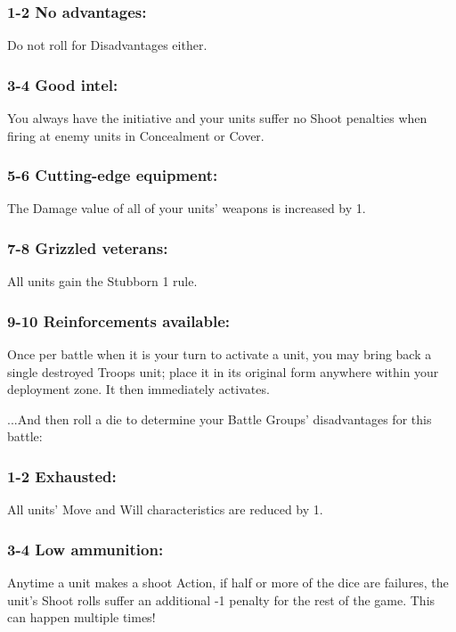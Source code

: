 \begin{multicols}{2}
\subsubsection*{1-2 No advantages:} Do not roll for Disadvantages either.

\subsubsection*{3-4 Good intel:} You always have the initiative and your units suffer no Shoot penalties when firing at enemy units in Concealment or Cover.

\subsubsection*{5-6 Cutting-edge equipment:} The Damage value of all of your units' weapons is increased by 1.

\subsubsection*{7-8 Grizzled veterans:} All units gain the Stubborn 1 rule.

\subsubsection*{9-10 Reinforcements available:} Once per battle when it is your turn to activate a unit, you may bring back a single destroyed Troops unit; place it in its original form anywhere within your deployment zone. It then immediately activates.

\vspace{2em}

...And then roll a die to determine your Battle Groups' disadvantages for this battle:

\subsubsection*{1-2 Exhausted:} All units' Move and Will characteristics are reduced by 1.

\subsubsection*{3-4 Low ammunition:} Anytime a unit makes a shoot Action, if half or more of the dice are failures, the unit's Shoot rolls suffer an additional -1 penalty for the rest of the game. This can happen multiple times!


\end{multicols}
